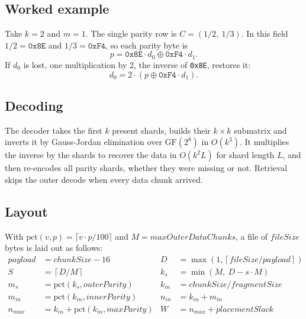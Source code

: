 \documentclass[10pt,a4paper,final]{article}
\newcommand{\code}[1]{\texttt{#1}}
\begin{document}
\subsection{Worked example}

Take $k = 2$ and $m = 1$. The single parity row is $C = (1/2,\ 1/3)$. In this field $1/2 = \mathtt{0x8E}$ and
$1/3 = \mathtt{0xF4}$, so each parity byte is
\begin{equation}
	p = \mathtt{0x8E} \cdot d_0 \oplus \mathtt{0xF4} \cdot d_1 .
\end{equation}
If $d_0$ is lost, one multiplication by 2, the inverse of \code{0x8E}, restores it:
\begin{equation}
	d_0 = 2 \cdot (p \oplus \mathtt{0xF4} \cdot d_1) .
\end{equation}

\subsection{Decoding}

The decoder takes the first $k$ present shards, builds their $k \times k$ submatrix and inverts it by Gauss-Jordan
elimination over $\mathrm{GF}(2^8)$ in $O(k^3)$. It multiplies the inverse by the shards to recover the data in
$O(k^2 L)$ for shard length $L$, and then re-encodes all parity shards, whether they were missing or not. Retrieval
skips the outer decode when every data chunk arrived.

\subsection{Layout}
\label{sec:layout}

With $\mathrm{pct}(v, p) = \lceil v \cdot p / 100 \rceil$ and $M = \mathit{maxOuterDataChunks}$, a file of
$\mathit{fileSize}$ bytes is laid out as follows:
\begin{align}
	\mathit{payload} &= \mathit{chunkSize} - 16 & D &= \max\left(1, \left\lceil \mathit{fileSize} / \mathit{payload}
	\right\rceil\right) \\
	S &= \left\lceil D / M \right\rceil & k_s &= \min(M,\ D - s \cdot M) \\
	m_s &= \mathrm{pct}(k_s, \mathit{outerParity}) & k_{in} &= \mathit{chunkSize} / \mathit{fragmentSize} \\
	m_{in} &= \mathrm{pct}(k_{in}, \mathit{innerParity}) & n_{in} &= k_{in} + m_{in} \\
	n_{max} &= k_{in} + \mathrm{pct}(k_{in}, \mathit{maxParity}) & W &= n_{max} + \mathit{placementSlack}
\end{align}
\end{document}
